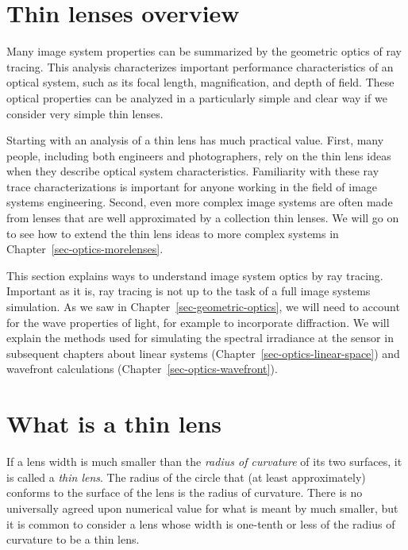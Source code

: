 \documentclass[
  letterpaper,
]{book}
\begin{document}
\section{Thin lenses overview}\label{sec-optics-thinlens-overview}

Many image system properties can be summarized by the geometric optics
of ray tracing. This analysis characterizes important performance
characteristics of an optical system, such as its focal length,
magnification, and depth of field. These optical properties can be
analyzed in a particularly simple and clear way if we consider very
simple thin lenses.

Starting with an analysis of a thin lens has much practical value.
First, many people, including both engineers and photographers, rely on
the thin lens ideas when they describe optical system characteristics.
Familiarity with these ray trace characterizations is important for
anyone working in the field of image systems engineering. Second, even
more complex image systems are often made from lenses that are well
approximated by a collection thin lenses. We will go on to see how to
extend the thin lens ideas to more complex systems in
Chapter~\ref{sec-optics-morelenses}.

This section explains ways to understand image system optics by ray
tracing. Important as it is, ray tracing is not up to the task of a full
image systems simulation. As we saw in
Chapter~\ref{sec-geometric-optics}, we will need to account for the wave
properties of light, for example to incorporate diffraction. We will
explain the methods used for simulating the spectral irradiance at the
sensor in subsequent chapters about linear systems
(Chapter~\ref{sec-optics-linear-space}) and wavefront calculations
(Chapter~\ref{sec-optics-wavefront}).

\section{What is a thin lens}\label{sec-optics-thinlensdefined}

If a lens width is much smaller than the \emph{radius of curvature} of
its two surfaces, it is called a \emph{thin lens}. The radius of the
circle that (at least approximately) conforms to the surface of the lens
is the radius of curvature. There is no universally agreed upon
numerical value for what is meant by much smaller, but it is common to
consider a lens whose width is one-tenth or less of the radius of
curvature to be a thin lens.
\end{document}
